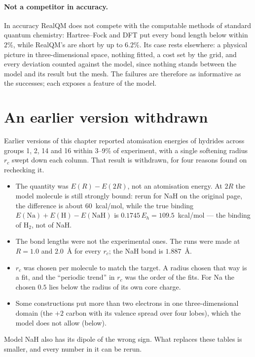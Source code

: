 \paragraph{Not a competitor in accuracy.} In accuracy RealQM does not compete with the computable methods of
standard quantum chemistry: Hartree--Fock and DFT put every bond length below within $2\%$, while RealQM's
are short by up to $6.2\%$. Its case rests elsewhere: a physical picture in three-dimensional space, nothing fitted, a cost set by
the grid, and every deviation counted against the model, since nothing stands between the model and its
result but the mesh. The failures are therefore as informative as the successes; each exposes a feature of
the model.

\section{An earlier version withdrawn}\label{sec:hydride-setup}

Earlier versions of this chapter reported atomisation energies of hydrides across groups 1, 2, 14 and
16 within 3--9\% of experiment, with a single softening radius $r_c$ swept down each column. That
result is withdrawn, for four reasons found on rechecking it.
\begin{itemize}
\item The quantity was $E(R) - E(2R)$, not an atomisation energy. At $2R$ the model molecule is still
  strongly bound: rerun for NaH on the original page, the difference is about 60~kcal/mol, while the true
  binding $E(\mathrm{Na}) + E(\mathrm{H}) - E(\mathrm{NaH})$ is $0.1745\,E_h = 109.5$~kcal/mol --- the
  binding of H$_2$, not of NaH.
\item The bond lengths were not the experimental ones. The runs were made at $R = 1.0$ and $2.0$~\AA{} for
  every $r_c$; the NaH bond is $1.887$~\AA.
\item $r_c$ was chosen per molecule to match the target. A radius chosen that way is a fit, and the
  ``periodic trend'' in $r_c$ was the order of the fits. For Na the chosen $0.5$ lies below the radius of
  its own core charge.
\item Some constructions put more than two electrons in one three-dimensional domain (the $+2$
  carbon with its valence spread over four lobes), which the model does not allow (below).
\end{itemize}
Model NaH also has its dipole of the wrong sign. What replaces these tables is smaller, and every number
in it can be rerun.

